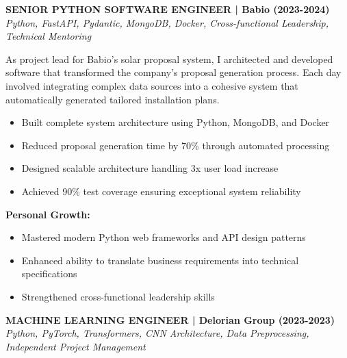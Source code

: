 \documentclass[a4paper,10pt]{article}
\begin{document}
{\begin{minipage}{\dimexpr\textwidth-2\fboxsep\relax}
		\vspace{0.4cm}

		\noindent\textbf{SENIOR PYTHON SOFTWARE ENGINEER | Babio (2023-2024)} \\
		\vspace{0.1cm}
		{\small\textit{Python, FastAPI, Pydantic, MongoDB, Docker, Cross-functional Leadership, Technical Mentoring}}
		\vspace{0.2cm}

		As project lead for Babio's solar proposal system, I architected and developed software that transformed the company's proposal generation process. Each day involved integrating complex data sources into a cohesive system that automatically generated tailored installation plans.

		\vspace{0.2cm}
		\begin{itemize}[label=\textcolor{darkblue}{\textbullet}, leftmargin=*, nosep]
			\item Built complete system architecture using Python, MongoDB, and Docker
			\item Reduced proposal generation time by 70\% through automated processing
			\item Designed scalable architecture handling 3x user load increase
			\item Achieved 90\% test coverage ensuring exceptional system reliability
		\end{itemize}

		\vspace{0.2cm}
		\textbf{Personal Growth:}
		\vspace{0.2cm}
		\begin{itemize}[label=\textcolor{darkblue}{\textbullet}, leftmargin=*, nosep]
			\item Mastered modern Python web frameworks and API design patterns
			\item Enhanced ability to translate business requirements into technical specifications
			\item Strengthened cross-functional leadership skills
		\end{itemize}

		\vspace{0.4cm}

		\noindent\textbf{MACHINE LEARNING ENGINEER | Delorian Group (2023-2023)} \\
		\vspace{0.1cm}
		{\small\textit{Python, PyTorch, Transformers, CNN Architecture, Data Preprocessing, Independent Project Management}}
		\vspace{0.2cm}


\end{minipage}}
\end{document}
